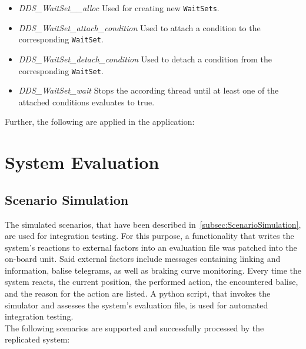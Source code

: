 \begin{itemize}
\item \textit{DDS\_WaitSet\_\_alloc} Used for creating new \texttt{WaitSets}.
\item \textit{DDS\_WaitSet\_attach\_condition} Used to attach a condition to the corresponding \texttt{WaitSet}.
\item \textit{DDS\_WaitSet\_detach\_condition} Used to detach a condition from the corresponding \texttt{WaitSet}.
\item \textit{DDS\_WaitSet\_wait} Stops the according thread until at least one of the attached conditions evaluates to true.
\end{itemize}

Further, the following  are applied in the application:


\section{System Evaluation}

\subsection{Scenario Simulation}
The simulated scenarios, that have been described in~\autoref{subsec:ScenarioSimulation}, are used for integration testing.
For this purpose, a functionality that writes the system's reactions to external factors into an evaluation file was patched into the on-board unit.
Said external factors include  messages containing linking and  information, balise telegrams, as well as braking curve monitoring.
Every time the system reacts, the current position, the performed action, the encountered balise, and the reason for the action are listed.
A python script, that invokes the simulator and assesses the system's evaluation file, is used for automated integration testing.
\\

The following scenarios are supported and successfully processed by the replicated system:

